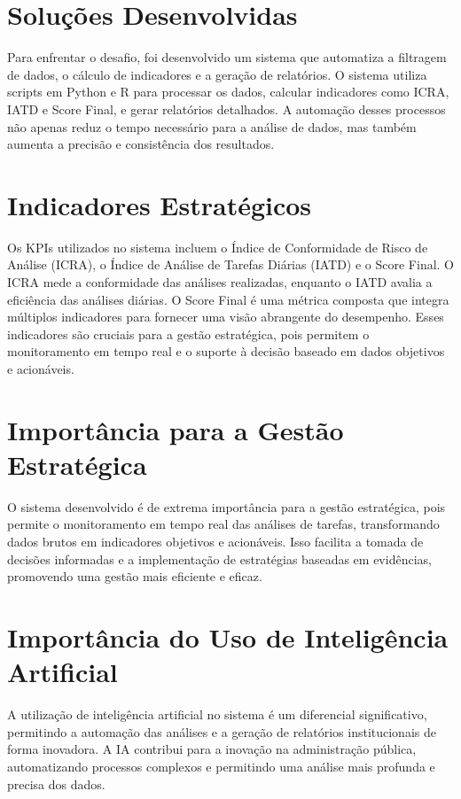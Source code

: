 \documentclass[11pt]{article}
\begin{document}
\section{Soluções Desenvolvidas}
\label{sec:org972032b}
Para enfrentar o desafio, foi desenvolvido um sistema que automatiza a filtragem de dados, o cálculo de indicadores e a geração de relatórios. O sistema utiliza scripts em Python e R para processar os dados, calcular indicadores como ICRA, IATD e Score Final, e gerar relatórios detalhados. A automação desses processos não apenas reduz o tempo necessário para a análise de dados, mas também aumenta a precisão e consistência dos resultados.

\section{Indicadores Estratégicos}
\label{sec:orgf20ed25}
Os KPIs utilizados no sistema incluem o Índice de Conformidade de Risco de Análise (ICRA), o Índice de Análise de Tarefas Diárias (IATD) e o Score Final. O ICRA mede a conformidade das análises realizadas, enquanto o IATD avalia a eficiência das análises diárias. O Score Final é uma métrica composta que integra múltiplos indicadores para fornecer uma visão abrangente do desempenho. Esses indicadores são cruciais para a gestão estratégica, pois permitem o monitoramento em tempo real e o suporte à decisão baseado em dados objetivos e acionáveis.

\section{Importância para a Gestão Estratégica}
\label{sec:org2ce7168}
O sistema desenvolvido é de extrema importância para a gestão estratégica, pois permite o monitoramento em tempo real das análises de tarefas, transformando dados brutos em indicadores objetivos e acionáveis. Isso facilita a tomada de decisões informadas e a implementação de estratégias baseadas em evidências, promovendo uma gestão mais eficiente e eficaz.

\section{Importância do Uso de Inteligência Artificial}
\label{sec:org2e2ad59}
A utilização de inteligência artificial no sistema é um diferencial significativo, permitindo a automação das análises e a geração de relatórios institucionais de forma inovadora. A IA contribui para a inovação na administração pública, automatizando processos complexos e permitindo uma análise mais profunda e precisa dos dados.
\end{document}
